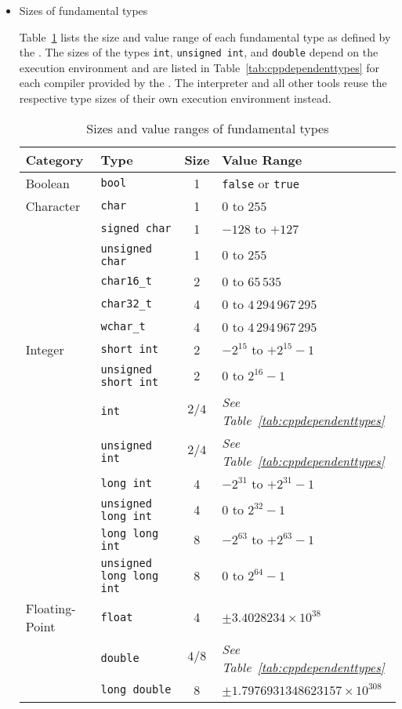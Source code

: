 \begin{itemize}

\item Sizes of fundamental types 

Table~\ref{tab:cppfundamentaltypes} lists the size and value range of each fundamental type as defined by the \ecs{}.
The sizes of the types \texttt{int}, \texttt{unsigned int}, and \texttt{double} depend on the execution environment and are listed in Table~\ref{tab:cppdependenttypes} for each \cpp{} compiler provided by the \ecs{}.
The interpreter and all other tools reuse the respective type sizes of their own execution environment instead.

\begin{table}
\centering
\begin{tabular}{@{}llcl@{}}
\toprule Category & Type & Size & Value Range \\
\midrule Boolean
& \texttt{bool} & 1 & \texttt{false} or \texttt{true} \\
\midrule Character
& \texttt{char} & 1 & $0$ to $255$ \\
& \texttt{signed char} & 1 & $-128$ to $+127$ \\
& \texttt{unsigned char} & 1 & $0$ to $255$ \\
& \texttt{char16_t} & 2 & $0$ to $65\,535$ \\
& \texttt{char32_t} & 4 & $0$ to $4\,294\,967\,295$ \\
& \texttt{wchar_t} & 4 & $0$ to $4\,294\,967\,295$ \\
\midrule Integer
& \texttt{short int} & 2 & $-2^{15}$ to $+2^{15}-1$ \\
& \texttt{unsigned short int} & 2 & $0$ to $2^{16}-1$ \\
& \texttt{int} & $2/4$ & \emph{See Table~\ref{tab:cppdependenttypes}} \\
& \texttt{unsigned int} & $2/4$ & \emph{See Table~\ref{tab:cppdependenttypes}} \\
& \texttt{long int} & 4 & $-2^{31}$ to $+2^{31}-1$ \\
& \texttt{unsigned long int} & 4 & $0$ to $2^{32}-1$ \\
& \texttt{long long int} & 8 & $-2^{63}$ to $+2^{63}-1$ \\
& \texttt{unsigned long long int} & 8 & $0$ to $2^{64}-1$ \\
\midrule Floating-Point
& \texttt{float} & 4 & $\pm 3.4028234 \times 10^{38}$ \\
& \texttt{double} & $4/8$ & \emph{See Table~\ref{tab:cppdependenttypes}} \\
& \texttt{long double} & 8 & $\pm 1.7976931348623157 \times 10^{308}$ \\
\bottomrule
\end{tabular}
\caption{Sizes and value ranges of fundamental \cpp{} types}
\label{tab:cppfundamentaltypes}
\end{table}


\end{itemize}
